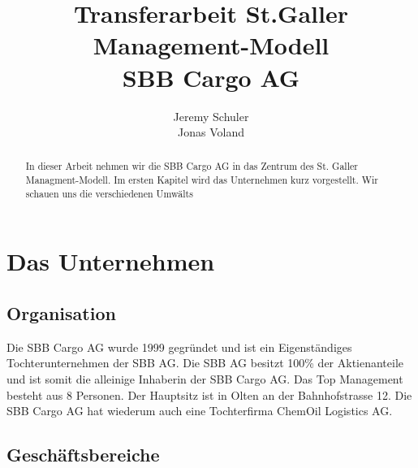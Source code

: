 \documentclass{article}
\title{
    Transferarbeit St.Galler Management-Modell
    \\SBB Cargo AG}
\author{
    Jeremy Schuler\\
    Jonas Voland
}
\begin{document}
\begin{titlepage}
    \maketitle
\end{titlepage}

\setcounter{page}{2}

\begin{abstract}
    In dieser Arbeit nehmen wir die SBB Cargo AG in das Zentrum des St. Galler Managment-Modell.
    Im ersten Kapitel wird das Unternehmen kurz vorgestellt.
    Wir schauen uns die verschiedenen Umwälts
\end{abstract}

\tableofcontents

\newpage

\section{Das Unternehmen}

\subsection{Organisation}

Die SBB Cargo AG wurde 1999 gegründet und ist ein Eigenständiges Tochterunternehmen der SBB AG.
Die SBB AG besitzt 100\% der Aktienanteile und ist somit die alleinige Inhaberin der SBB Cargo AG.
Das Top Management besteht aus 8 Personen.
Der Hauptsitz ist in Olten an der Bahnhofstrasse 12.
Die SBB Cargo AG hat wiederum auch eine Tochterfirma ChemOil Logistics AG. \cite{test}

\subsection{Geschäftsbereiche}

\newpage

\printbibliography
\end{document}
